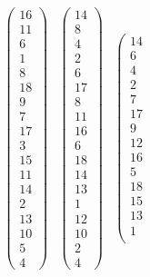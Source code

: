 \begin{equation*} 
\begin{array}{ccccc}
\left(\begin{array}{c}
	16\\
	11\\
	6\\
	1\\
	8\\
	18\\
	9\\
	7\\
	17\\
	3\\
	15\\
	11\\
	14\\
	2\\
	13\\
	10\\
	5\\
	4
\end{array} \right)  & \left(\begin{array}{c}
	14\\
	8\\
	4\\
	2\\
	6\\
	17\\
	8\\
	11\\
	16\\
	6\\
	18\\
	14\\
	13\\
	1\\
	12\\
	10\\
	2\\
	4
\end{array} \right) & \left(\begin{array}{c}
14\\
6\\
4\\
2\\
7\\
17\\
9\\
12\\
16\\
5\\
18\\
15\\
13\\
1\\

\end{array}
\end{array}
\end{equation*}
